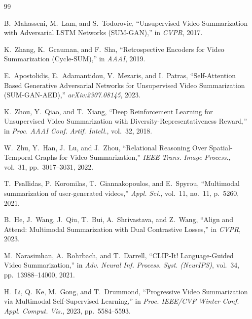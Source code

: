 \documentclass[10pt,conference]{IEEEtran}
\begin{document}
\begin{thebibliography}{99}

B.~Mahasseni, M.~Lam, and S.~Todorovic,
``Unsupervised Video Summarization with Adversarial LSTM Networks (SUM-GAN),''
in \textit{CVPR}, 2017.

K.~Zhang, K.~Grauman, and F.~Sha,
``Retrospective Encoders for Video Summarization (Cycle-SUM),''
in \textit{AAAI}, 2019.

E.~Apostolidis, E.~Adamantidou, V.~Mezaris, and I.~Patras,
``Self-Attention Based Generative Adversarial Networks for Unsupervised Video
Summarization (SUM-GAN-AED),''
\textit{arXiv:2307.08145}, 2023.

K.~Zhou, Y.~Qiao, and T.~Xiang,
``Deep Reinforcement Learning for Unsupervised Video Summarization with
Diversity-Representativeness Reward,''
in \textit{Proc. AAAI Conf. Artif. Intell.}, vol.~32, 2018.


W.~Zhu, Y.~Han, J.~Lu, and J.~Zhou,
``Relational Reasoning Over Spatial-Temporal Graphs for Video Summarization,''
\textit{IEEE Trans. Image Process.}, vol.~31, pp.~3017--3031, 2022.


T.~Psallidas, P.~Koromilas, T.~Giannakopoulos, and E.~Spyrou,
``Multimodal summarization of user-generated videos,''
\textit{Appl. Sci.}, vol.~11, no.~11, p.~5260, 2021.

B.~He, J.~Wang, J.~Qiu, T.~Bui, A.~Shrivastava, and Z.~Wang,
``Align and Attend: Multimodal Summarization with Dual Contrastive Losses,''
in \textit{CVPR}, 2023.

M.~Narasimhan, A.~Rohrbach, and T.~Darrell,
``CLIP-It! Language-Guided Video Summarization,''
in \textit{Adv. Neural Inf. Process. Syst. (NeurIPS)}, vol.~34,
pp.~13988--14000, 2021.

H.~Li, Q.~Ke, M.~Gong, and T.~Drummond,
``Progressive Video Summarization via Multimodal Self-Supervised Learning,''
in \textit{Proc. IEEE/CVF Winter Conf. Appl. Comput. Vis.}, 2023,
pp.~5584--5593.



\end{thebibliography}
\end{document}
